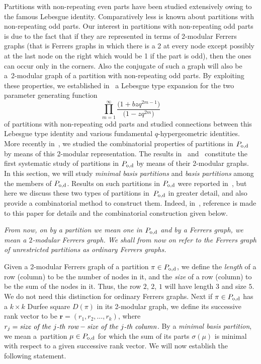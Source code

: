 \documentclass[pdftex]{sigma}
\numberwithin{equation}{section}
\theoremstyle{definition}
\begin{document}
Partitions with non-repeating even parts have been studied extensively owing
to the famous Lebesgue identity. Comparatively less is known about partitions
with non-repeating odd parts. Our interest in partitions with non-repeating
odd parts is due to the fact that if they are represented in terms of 2-modular
Ferrers graphs (that is Ferrers graphs in which there is a 2 at every node
except possibly at the last node on the right which would be 1 if the part
is odd), then the ones can occur only in the corners. Also the conjugate of
such a graph will also be a~2-modular graph of a partition with non-repeating
odd parts. By exploiting these properties, we established in~\cite{Al2010} a Lebesgue
type expansion for the two parameter generating function
\[
\prod^{\infty}_{m=1}\frac{\bigl(1+bzq^{2m-1}\bigr)}{\bigl(1-zq^{2m}\bigr)}
\]
of partitions with non-repeating odd parts and studied connections between this
Lebesgue type identity and various fundamental $q$-hypergeometric identities.
More recently in~\cite{Al2016}, we studied the combinatorial properties of partitions in
$P_{\rm o,d}$ by means of this 2-modular representation. The results in~\cite{Al2010} and~\cite{Al2016}
constitute the first systematic study of partitions in $P_{\rm o,d}$ by means of
their 2-modular graphs. In this section, we will study {\it minimal basis partitions}
and {\it basis partitions} among
the members of $P_{\rm o,d}$. Results on such partitions in $P_{\rm o,d}$ were reported
in~\cite{Al2016}, but here we discuss these two types of partitions in~$P_{\rm o,d}$ in greater detail, and also provide a combinatorial method to construct them. Indeed, in~\cite{Al2016}, reference is made to this paper for details and the combinatorial construction given below.

{\it From now, on by a partition we mean one in $P_{\rm o,d}$ and by a Ferrers graph, we mean a $2$-modular Ferrers graph. We shall from now on refer to the Ferrers graph of unrestricted partitions as ordinary Ferrers graphs.}

Given a 2-modular Ferrers graph of a partition $\pi\in P_{\rm o,d}$, we define
the {\it length} of a row (column) to be the number of nodes in it, and the
{\it size} of a row (column) to be the sum of the nodes in it. Thus, the
row $2$, $2$, $1$ will have length $3$ and size $5$. We do not need this distinction
for ordinary Ferrers graphs.
Next if $\pi\in P_{\rm o,d}$ has a $k\times k$ Durfee square $D(\pi)$ in its
2-modular graph, we define its successive rank vector to be
$\mathbf{r}=(r_1,r_2,\dots ,r_k)$, where
$
r_j= \text{\it size of the $j$-th row} - \text{\it size of the $j$-th column}$.
By a {\it minimal basis partition}, we mean a~partition $\mu\in P_{\rm o,d}$ for
which the sum of its parts $\sigma(\mu)$ is minimal with respect to a given
successive rank vector. We will now establish the following statement.
\end{document}
